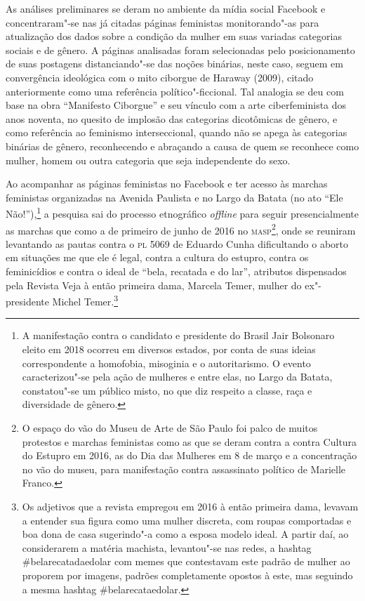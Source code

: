 As análises preliminares se deram no ambiente da mídia social Facebook e
concentraram"-se nas já citadas páginas feministas monitorando"-as para
atualização dos dados sobre a condição da mulher em suas variadas
categorias sociais e de gênero. A páginas analisadas foram selecionadas
pelo posicionamento de suas postagens distanciando"-se das noções
binárias, neste caso, seguem em convergência ideológica com o mito
ciborgue de Haraway (2009), citado anteriormente como uma referência
político"-ficcional. Tal analogia se deu com base na obra ``Manifesto
Ciborgue'' e seu vínculo com a arte ciberfeminista dos anos noventa, no
quesito de implosão das categorias dicotômicas de gênero, e como
referência ao feminismo interseccional, quando não se apega às
categorias binárias de gênero, reconhecendo e abraçando a causa de quem
se reconhece como mulher, homem ou outra categoria que seja independente
do sexo.

Ao acompanhar as páginas feministas no Facebook e ter acesso às marchas
feministas organizadas na Avenida Paulista e no Largo da Batata (no ato
``Ele Não!''),\footnote{A manifestação contra o candidato e presidente do
  Brasil Jair Bolsonaro eleito em 2018 ocorreu em diversos estados, por
  conta de suas ideias correspondente a homofobia, misoginia e o
  autoritarismo. O evento caracterizou"-se pela ação de mulheres e entre
  elas, no Largo da Batata, constatou"-se um público misto, no que diz
  respeito a classe, raça e diversidade de gênero.} a pesquisa sai
do processo etnográfico \emph{offline} para seguir presencialmente as marchas
que como a de primeiro de junho de 2016 no \textsc{masp}\footnote{O espaço do vão
  do Museu de Arte de São Paulo foi palco de muitos protestos e marchas
  feministas como as que se deram contra a contra Cultura do Estupro em
  2016, as do Dia das Mulheres em 8 de março e a concentração no vão do
  museu, para manifestação contra assassinato político de Marielle
  Franco.}, onde se reuniram levantando as pautas contra o \textsc{pl} 5069 de
Eduardo Cunha dificultando o aborto em situações me que ele é legal,
contra a cultura do estupro, contra os feminicídios e contra o ideal de
``bela, recatada e do lar'', atributos dispensados pela Revista Veja à
então primeira dama, Marcela Temer, mulher do ex"-presidente Michel
Temer.\footnote{Os adjetivos que a revista empregou em 2016 à então
  primeira dama, levavam a entender sua figura como uma mulher discreta,
  com roupas comportadas e boa dona de casa sugerindo"-a como a esposa
  modelo ideal. A partir daí, ao considerarem a matéria machista,
  levantou"-se nas redes, a hashtag \#belarecatadaedolar com memes que
  contestavam este padrão de mulher ao proporem por imagens, padrões
  completamente opostos à este, mas seguindo a mesma hashtag
  \#belarecataedolar.}

